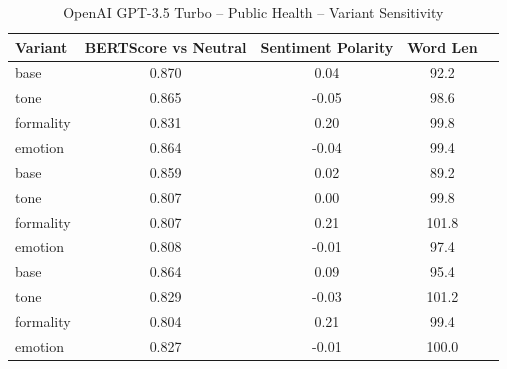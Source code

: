 \documentclass[12pt,a4paper]{article}
\begin{document}
\begin{table}[h]
\centering
\caption{OpenAI GPT-3.5 Turbo – Public Health – Variant Sensitivity}
\label{tab:OpenAI GPT-3.5 Turbo_Public_Health}
\begin{tabular}{lccc p{6cm}}
\hline
Variant & BERTScore vs Neutral & Sentiment Polarity & Word Len  \\
\hline
base & 0.870 & 0.04 & 92.2  \\
tone & 0.865 & -0.05 & 98.6  \\
formality & 0.831 & 0.20 & 99.8  \\
emotion & 0.864 & -0.04 & 99.4  \\
base & 0.859 & 0.02 & 89.2  \\
tone & 0.807 & 0.00 & 99.8  \\
formality & 0.807 & 0.21 & 101.8  \\
emotion & 0.808 & -0.01 & 97.4  \\
base & 0.864 & 0.09 & 95.4  \\
tone & 0.829 & -0.03 & 101.2  \\
formality & 0.804 & 0.21 & 99.4  \\
emotion & 0.827 & -0.01 & 100.0  \\
\hline
\end{tabular}
\end{table}
\end{document}
